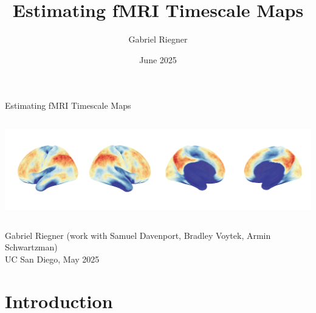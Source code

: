\documentclass[8pt,aspectratio=169]{beamer}
\title{Estimating fMRI Timescale Maps}
\author[]{Gabriel Riegner}
\date{June 2025}
\begin{document}
\begin{frame}{\large Estimating fMRI Timescale Maps}
\begin{columns}
\tableofcontents[hideallsubsections]
\includegraphics[width=1\textwidth]{docs/wnar/toc.pdf}
\end{columns}

\vfill
\centering
Gabriel Riegner (work with Samuel Davenport, Bradley Voytek, Armin Schwartzman)\\
UC San Diego, May 2025

\end{frame}

\section{Introduction}
\end{document}
